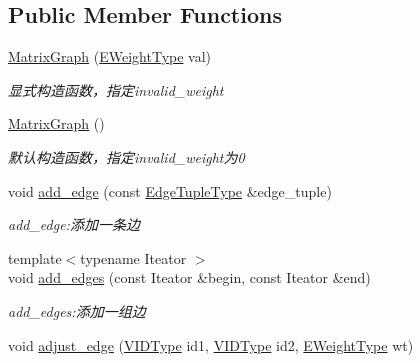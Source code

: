 \subsection*{Public Member Functions}
\begin{DoxyCompactItemize}
\item 
\hyperlink{struct_introduction_to_algorithm_1_1_graph_algorithm_1_1_matrix_graph_abe357f589d4b46be1cbb8b36d7434681}{Matrix\+Graph} (\hyperlink{struct_introduction_to_algorithm_1_1_graph_algorithm_1_1_matrix_graph_af54dbf6d171b89b81b490de13f1fb02f}{E\+Weight\+Type} val)
\begin{DoxyCompactList}\small\item\em 显式构造函数，指定{\ttfamily invalid\+\_\+weight} \end{DoxyCompactList}\item 
\hyperlink{struct_introduction_to_algorithm_1_1_graph_algorithm_1_1_matrix_graph_a5e0154a5eed096fe10a03519022fd24d}{Matrix\+Graph} ()
\begin{DoxyCompactList}\small\item\em 默认构造函数，指定{\ttfamily invalid\+\_\+weight}为0 \end{DoxyCompactList}\item 
void \hyperlink{struct_introduction_to_algorithm_1_1_graph_algorithm_1_1_matrix_graph_a91283bb66d4daa938cd521d348e00984}{add\+\_\+edge} (const \hyperlink{struct_introduction_to_algorithm_1_1_graph_algorithm_1_1_matrix_graph_ad698e07bacdb3f332c4f5d34bdb49463}{Edge\+Tuple\+Type} \&edge\+\_\+tuple)
\begin{DoxyCompactList}\small\item\em add\+\_\+edge\+:添加一条边 \end{DoxyCompactList}\item 
{\footnotesize template$<$typename Iteator $>$ }\\void \hyperlink{struct_introduction_to_algorithm_1_1_graph_algorithm_1_1_matrix_graph_a0fac196d4c47c2855267eb2cf888ef14}{add\+\_\+edges} (const Iteator \&begin, const Iteator \&end)
\begin{DoxyCompactList}\small\item\em add\+\_\+edges\+:添加一组边 \end{DoxyCompactList}\item 
void \hyperlink{struct_introduction_to_algorithm_1_1_graph_algorithm_1_1_matrix_graph_aa16d1f2e6949d0adccc30b0704013e6d}{adjust\+\_\+edge} (\hyperlink{struct_introduction_to_algorithm_1_1_graph_algorithm_1_1_matrix_graph_ae97378c88e8d65a880334f31a352e71d}{V\+I\+D\+Type} id1, \hyperlink{struct_introduction_to_algorithm_1_1_graph_algorithm_1_1_matrix_graph_ae97378c88e8d65a880334f31a352e71d}{V\+I\+D\+Type} id2, \hyperlink{struct_introduction_to_algorithm_1_1_graph_algorithm_1_1_matrix_graph_af54dbf6d171b89b81b490de13f1fb02f}{E\+Weight\+Type} wt)

\end{DoxyCompactItemize}
